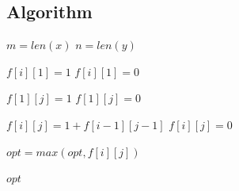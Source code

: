 \documentclass{article}
\begin{document}
    \subsection*{Algorithm}
        \begin{algorithm}[H]
            \begin{algorithmic}
                    \State $m = len(x)$
                    \State $n = len(y)$

                            \State $f[i][1] = 1$
                        \Else
                            \State $f[i][1] = 0$
                        \EndIf
                    \EndFor

                            \State $f[1][j] = 1$
                        \Else
                            \State $f[1][j] = 0$
                        \EndIf
                    \EndFor

                                \State $f[i][j] = 1 + f[i-1][j-1]$
                            \Else
                                \State $f[i][j] = 0$
                            \EndIf
                        \EndFor
                    \EndFor

                            \State $opt = max(opt, f[i][j])$
                        \EndFor
                    \EndFor

                    \State \Return $opt$
                \EndProcedure
            \end{algorithmic}
        \end{algorithm}
\end{document}
